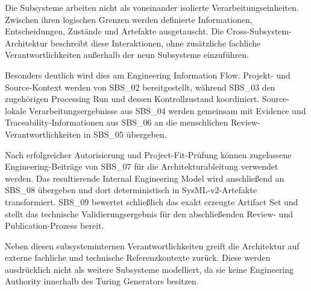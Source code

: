 %
%
%
%
%
%
%
%
%
%

Die Subsysteme arbeiten nicht als voneinander isolierte Verarbeitungseinheiten.
Zwischen ihren logischen Grenzen werden definierte Informationen,
Entscheidungen, Zustände und Artefakte ausgetauscht. Die
Cross-Subsystem-Architektur beschreibt diese Interaktionen, ohne zusätzliche
fachliche Verantwortlichkeiten außerhalb der neun Subsysteme einzuführen.

Besonders deutlich wird dies am Engineering Information Flow. Projekt- und
Source-Kontext werden von SBS\_02 bereitgestellt, während SBS\_03 den
zugehörigen Processing Run und dessen Kontrollzustand koordiniert.
Source-lokale Verarbeitungsergebnisse aus SBS\_04 werden gemeinsam mit Evidence
und Traceability-Informationen aus SBS\_06 an die menschlichen
Review-Verantwortlichkeiten in SBS\_05 übergeben.

Nach erfolgreicher Autorisierung und Project-Fit-Prüfung können zugelassene
Engineering-Beiträge von SBS\_07 für die Architekturableitung verwendet
werden. Das resultierende Internal Engineering Model wird anschließend an
SBS\_08 übergeben und dort deterministisch in SysML-v2-Artefakte transformiert.
SBS\_09 bewertet schließlich das exakt erzeugte Artifact Set und stellt das
technische Validierungsergebnis für den abschließenden Review- und
Publication-Prozess bereit.

Neben diesen subsysteminternen Verantwortlichkeiten greift die Architektur auf
externe fachliche und technische Referenzkontexte zurück. Diese werden
ausdrücklich nicht als weitere Subsysteme modelliert, da sie keine
Engineering Authority innerhalb des Turing Generators besitzen.

